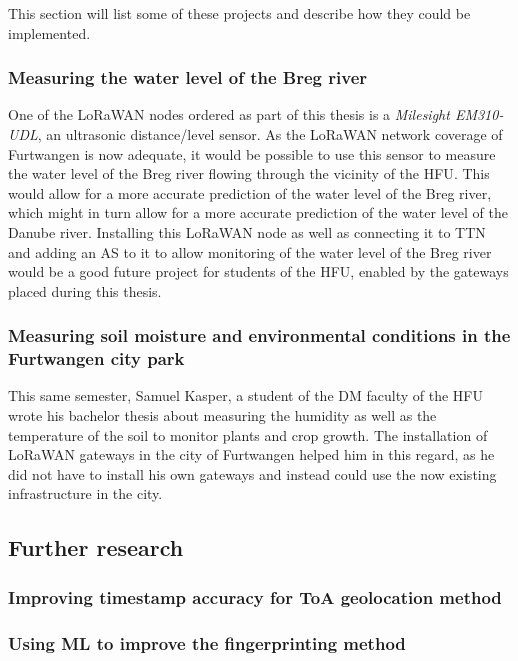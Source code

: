 This section will list some of these projects and describe how they could be implemented.

\subsubsection{Measuring the water level of the Breg river}

One of the \ac{LoRaWAN} nodes ordered as part of this thesis is a \emph{Milesight EM310-UDL}, an ultrasonic distance/level sensor.
As the \ac{LoRaWAN} network coverage of Furtwangen is now adequate, it would be possible to use this sensor to measure the water level of the Breg river flowing through the vicinity of the \ac{HFU}.
This would allow for a more accurate prediction of the water level of the Breg river, which might in turn allow for a more accurate prediction of the water level of the Danube river.
Installing this \ac{LoRaWAN} node as well as connecting it to \ac{TTN} and adding an \acf{AS} to it to allow monitoring of the water level of the Breg river would be a good future project for students of the \ac{HFU}, enabled by the gateways placed during this thesis.

\subsubsection{Measuring soil moisture and environmental conditions in the Furtwangen city park}

This same semester, Samuel Kasper, a student of the \ac{DM} faculty of the \ac{HFU} wrote his bachelor thesis about measuring the humidity as well as the temperature of the soil to monitor plants and crop growth.
The installation of \ac{LoRaWAN} gateways in the city of Furtwangen helped him in this regard, as he did not have to install his own gateways and instead could use the now existing infrastructure in the city.

\subsection{Further research}

\subsubsection{Improving timestamp accuracy for \acf{ToA} geolocation method}


\subsubsection{Using \acf{ML} to improve the fingerprinting method}